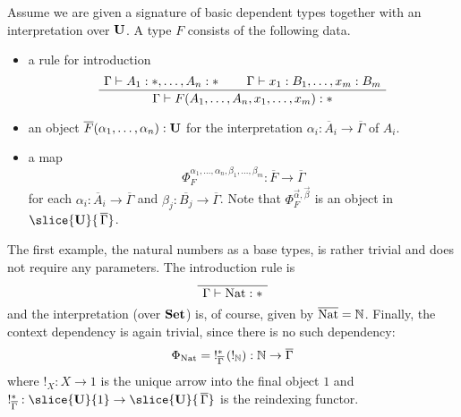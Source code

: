 \documentclass[runningheads,envcountsame,envcountsect,orivec]{llncs}
\begin{document}
Assume we are given a signature of basic dependent types together with an
interpretation over $\mathbf{U}$.
A type $F$ consists of the following data.
\begin{itemize}
\item a rule for introduction
  \begin{equation*}
    \AxiomC{$\Gamma \vdash A_1 : \ast, \dotsc, A_n : \ast$}
    \AxiomC{$\Gamma \vdash x_1 : B_1, \dotsc, x_m : B_m$}
    \BinaryInfC{$\Gamma \vdash F(A_1, \dotsc, A_n, x_1, \dotsc, x_m) : \ast$}
    \DisplayProof
  \end{equation*}
\item an object $\overline{F}(\alpha_1, \dotsc, \alpha_n) : \mathbf{U}$
  for the interpretation $\alpha_i : \overline{A}_i \to \overline{\Gamma}$ of
  $A_i$.
\item a map
  \begin{equation*}
    \Phi_F^{\alpha_1, \dotsc, \alpha_n, \beta_1, \dotsc, \beta_m} :
      \overline{F} \to \overline{\Gamma}
  \end{equation*}
  for each $\alpha_i : \overline{A}_i \to \overline{\Gamma}$
  and $\beta_j : \overline{B_j} \to \overline{\Gamma}$.
  Note that $\Phi_F^{\vec{\alpha},\vec{\beta}}$ is an object in
  $\slice{\Cat{U}}{\,\overline{\Gamma}}$.
\end{itemize}

\begin{example}
  The first example, the natural numbers as a base types, is rather trivial and
  does not require any parameters.
  The introduction rule is
  \begin{equation*}
    \AxiomC{}
    \UnaryInfC{$\Gamma \vdash \NatT : \ast$}
    \DisplayProof
  \end{equation*}
  and the interpretation (over $\mathbf{Set}$) is, of course, given by
  $\overline{\operatorname{Nat}} = \mathbb{N}$.
  Finally, the context dependency is again trivial, since there is no such
  dependency:
  \begin{equation*}
    \Phi_{\operatorname{Nat}} = \; !_{\overline{\Gamma}}^\ast \, ( !_{\mathbb{N}})
      : \mathbb{N} \to \overline{\Gamma}
  \end{equation*}
  where $!_X : X \to 1$ is the unique arrow into the final object $1$ and
  $!_{\overline{\Gamma}}^\ast :
  \slice{\Cat{U}}{1} \to \slice{\Cat{U}}{\, \overline{\Gamma}}$
  is the reindexing functor.
\end{example}
\end{document}
